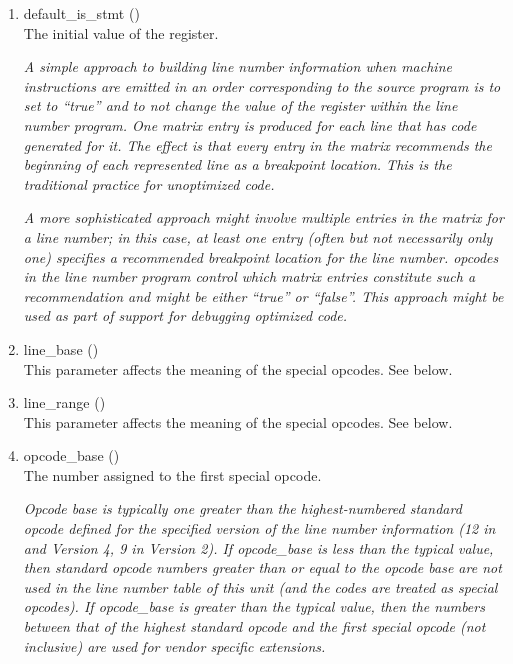 \begin{enumerate}[1. ]
\item default\_is\_stmt () \\
The initial value of the  register.  

\textit{A simple approach
to building line number information when machine instructions
are emitted in an order corresponding to the source program
is to set  
to ``true'' and to not change the
value of the  register 
within the line number program.
One matrix entry is produced for each line that has code
generated for it. The effect is that every entry in the
matrix recommends the beginning of each represented line as
a breakpoint location. This is the traditional practice for
unoptimized code.}

\textit{A more sophisticated approach might involve multiple entries in
the matrix for a line number; in this case, at least one entry
(often but not necessarily only one) specifies a recommended
breakpoint location for the line number. 
opcodes in the line number program control which matrix entries
constitute such a recommendation and 
 might
be either ``true'' or ``false''. This approach might be
used as part of support for debugging optimized code.}

\item line\_base () \\
This parameter affects the meaning of the special opcodes. See below.

\item line\_range () \\
This parameter affects the meaning of the special opcodes. See below.

\item opcode\_base () \\
The 
number assigned to the first special opcode.

\textit{Opcode base is typically one greater than the highest-numbered
standard opcode defined for the specified version of the line
number information (12 in 
 and 
Version 4, 9 in
Version 2).  
If opcode\_base is less than the typical value,
then standard opcode numbers greater than or equal to the
opcode base are not used in the line number table of this unit
(and the codes are treated as special opcodes). If opcode\_base
is greater than the typical value, then the numbers between
that of the highest standard opcode and the first special
opcode (not inclusive) are used for vendor specific extensions.}


\end{enumerate}
